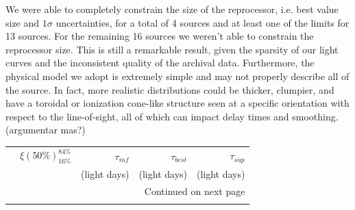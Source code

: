 We were able to completely constrain the size of the reprocessor, i.e. best value size and $1\sigma$ uncertainties, for a total of 4 sources and at least one of the limits for 13 sources. For the remaining 16 sources we weren't able to constrain the reprocessor size. This is still a remarkable result, given the sparsity of our light curves and the inconsistent quality of the archival data. Furthermore, the physical model we adopt is extremely simple and may not properly describe all of the source. In fact, more realistic distributions could be thicker, clumpier, and have a toroidal or ionization cone-like structure seen at a specific orientation with respect to the line-of-sight, all of which can impact delay times and smoothing. (argumentar mas?)

\begin{longtable}{llrrr}
\label{tab:taus}\\
\toprule
{} & $\xi(50\%)_{16\%}^{84\%}$   & $\tau_{inf}$ & $\tau_{best}$ & $\tau_{sup}$ \\
{} &                           & (light days) &  (light days) & (light days) \\
\midrule
\endhead
\midrule
\multicolumn{5}{r}{{Continued on next page}} \\
\midrule
\endfoot


\end{longtable}
